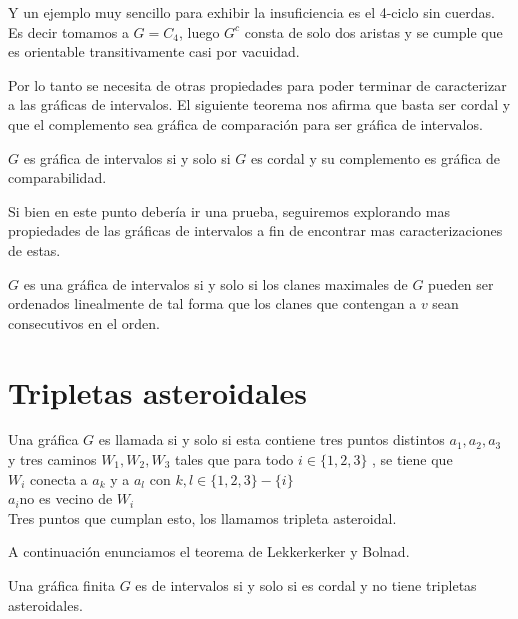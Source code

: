 Y un ejemplo muy sencillo para exhibir la insuficiencia es el 4-ciclo sin cuerdas.
Es decir tomamos a $G=C_4$, luego $G^c$ consta de solo dos aristas y se cumple que es orientable transitivamente casi por vacuidad.

Por lo tanto se necesita de otras propiedades para poder terminar de caracterizar a las gráficas de intervalos. El siguiente teorema nos afirma que basta ser cordal y que el complemento sea gráfica de comparación para ser gráfica de intervalos.

\begin{teorema}
\label{teo:203}
    $G$ es gráfica de intervalos si y solo si $G$ es cordal y su complemento es gráfica de comparabilidad.
\end{teorema}

Si bien en este punto debería ir una prueba, seguiremos explorando mas propiedades de las gráficas de intervalos a fin de encontrar mas caracterizaciones de estas.\\




\begin{teorema}
\label{teo:204}
    $G$ es una gráfica de intervalos si y solo si los clanes maximales de $G$ pueden ser ordenados linealmente de tal forma que los clanes que contengan a $v$ sean consecutivos en el orden.
\end{teorema}





\section{Tripletas asteroidales}
\label{sec:etiquetas}
Una gráfica $G$ es llamada  si y solo si esta contiene tres puntos distintos $a_1,a_2,a_3$ y tres caminos $W_1,W_2,W_3$ tales que para todo $i\in \{1,2,3\}$ , se tiene que \\
$W_i$ conecta a $a_k$ y a $a_l$ con $k,l\in\{1,2,3\}-\{i\}$\\
$a_i$no es vecino de $W_i$\\ 
Tres puntos que cumplan esto, los llamamos tripleta asteroidal.

A continuación enunciamos el teorema de Lekkerkerker y Bolnad.
\begin{teorema}
    Una gráfica finita $G$ es de intervalos si y solo si es cordal y no tiene tripletas asteroidales.
\end{teorema}














